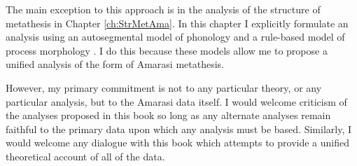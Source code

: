 The main exception to this approach is in the analysis
of the structure of metathesis in Chapter \ref{ch:StrMetAma}.
In this chapter I explicitly formulate an analysis
using an autosegmental model of phonology \citep{go76}
and a rule-based model of process morphology \citep{ma74,an92}.
I do this because these models allow me to propose a
unified analysis of the form of Amarasi metathesis.

However, my primary commitment is not to any particular theory,
or any particular analysis, but to the Amarasi data itself.
I would welcome criticism of the analyses
proposed in this book so long as any alternate analyses
remain faithful to the primary data upon which any analysis must be based.
Similarly, I would welcome any dialogue with this book
which attempts to provide a unified theoretical account of all of the data.